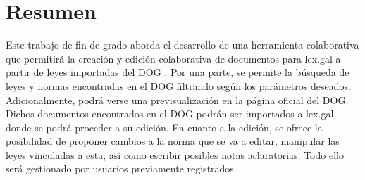 \pagestyle{plain}
\chapter*{Resumen}
Este trabajo de fin de grado aborda el desarrollo de una herramienta colaborativa que permitirá la creación y edición colaborativa de documentos para lex.gal \cite{lexgal} a partir de leyes importadas del DOG \cite{dog}. Por una parte, se permite la búsqueda de leyes y normas encontradas en el DOG filtrando según los parámetros deseados. Adicionalmente, podrá verse una previsualización en la página oficial del DOG. Dichos documentos encontrados en el DOG podrán ser importados a lex.gal, donde se podrá proceder a su edición. En cuanto a la edición, se ofrece la posibilidad de proponer cambios a la norma que se va a editar, manipular las leyes vinculadas a esta, así como escribir posibles notas aclaratorias. Todo ello será gestionado por usuarios previamente registrados.